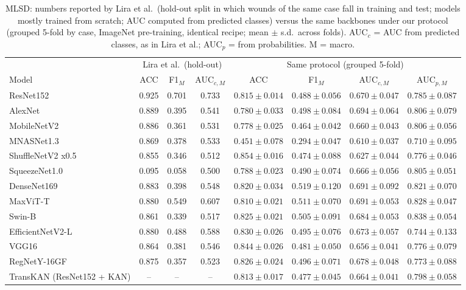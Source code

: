 \begin{table}[t]
\centering
\caption{MLSD: numbers reported by Lira et al.\ (hold-out split in which wounds of the same case fall in training and test; models mostly trained from scratch; AUC computed from predicted classes) versus the same backbones under our protocol (grouped 5-fold by case, ImageNet pre-training, identical recipe; mean $\pm$ s.d.\ across folds). AUC$_c$ = AUC from predicted classes, as in Lira et al.; AUC$_p$ = from probabilities. M = macro.}
\label{tab:comparacao2024_dist}
\scriptsize
\setlength{\tabcolsep}{3pt}
\begin{tabular}{lccc|cccc}
\hline
 & \multicolumn{3}{c|}{Lira et al.\ (hold-out)} & \multicolumn{4}{c}{Same protocol (grouped 5-fold)} \\
Model & ACC & F1$_M$ & AUC$_{c,M}$ & ACC & F1$_M$ & AUC$_{c,M}$ & AUC$_{p,M}$ \\
\hline
ResNet152 & 0.925 & 0.701 & 0.733 & $0.815\pm0.014$ & $0.488\pm0.056$ & $0.670\pm0.047$ & $0.785\pm0.087$ \\
AlexNet & 0.889 & 0.395 & 0.541 & $0.780\pm0.033$ & $0.498\pm0.084$ & $0.694\pm0.064$ & $0.806\pm0.079$ \\
MobileNetV2 & 0.886 & 0.361 & 0.531 & $0.778\pm0.025$ & $0.464\pm0.042$ & $0.660\pm0.043$ & $0.806\pm0.056$ \\
MNASNet1.3 & 0.869 & 0.378 & 0.533 & $0.451\pm0.078$ & $0.294\pm0.047$ & $0.610\pm0.037$ & $0.710\pm0.095$ \\
ShuffleNetV2 x0.5 & 0.855 & 0.346 & 0.512 & $0.854\pm0.016$ & $0.474\pm0.088$ & $0.627\pm0.044$ & $0.776\pm0.046$ \\
SqueezeNet1.0 & 0.095 & 0.058 & 0.500 & $0.788\pm0.023$ & $0.490\pm0.074$ & $0.666\pm0.056$ & $0.805\pm0.051$ \\
DenseNet169 & 0.883 & 0.398 & 0.548 & $0.820\pm0.034$ & $0.519\pm0.120$ & $0.691\pm0.092$ & $0.821\pm0.070$ \\
MaxViT-T & 0.880 & 0.549 & 0.607 & $0.810\pm0.021$ & $0.511\pm0.070$ & $0.691\pm0.053$ & $0.828\pm0.047$ \\
Swin-B & 0.861 & 0.339 & 0.517 & $0.825\pm0.021$ & $0.505\pm0.091$ & $0.684\pm0.053$ & $0.838\pm0.054$ \\
EfficientNetV2-L & 0.880 & 0.488 & 0.588 & $0.830\pm0.026$ & $0.495\pm0.076$ & $0.673\pm0.057$ & $0.744\pm0.133$ \\
VGG16 & 0.864 & 0.381 & 0.546 & $0.844\pm0.026$ & $0.481\pm0.050$ & $0.656\pm0.041$ & $0.776\pm0.079$ \\
RegNetY-16GF & 0.875 & 0.357 & 0.523 & $0.826\pm0.024$ & $0.496\pm0.071$ & $0.678\pm0.048$ & $0.773\pm0.088$ \\
TransKAN (ResNet152 + KAN) & -- & -- & -- & $0.813\pm0.017$ & $0.477\pm0.045$ & $0.664\pm0.041$ & $0.798\pm0.058$ \\
\hline
\end{tabular}
\end{table}
